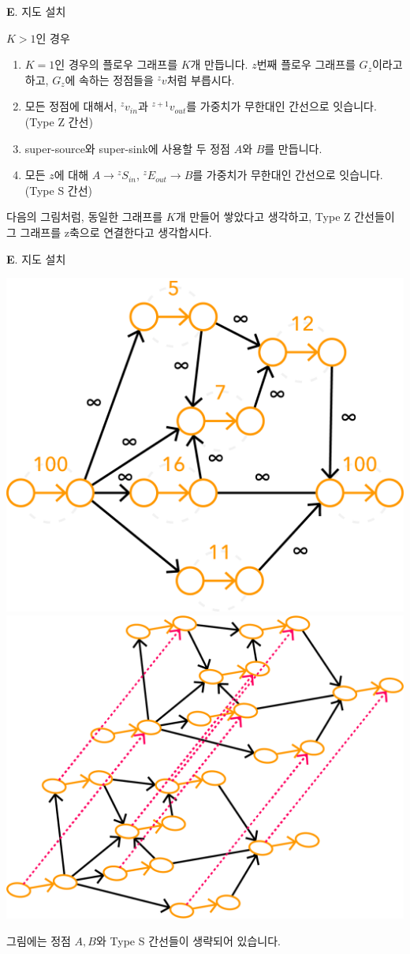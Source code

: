 \begin{frame}{\textbf{E}. 지도 설치}

    $K > 1$인 경우
    \begin{enumerate}
        \item $K=1$인 경우의 플로우 그래프를 $K$개 만듭니다. \newline
            $z$번째 플로우 그래프를 $G_z$이라고 하고, $G_z$에 속하는 정점들을 ${^z v}$처럼 부릅시다.
        \item 모든 정점에 대해서, $^z v _{in}$과 $^{z+1} v_{out}$를 가중치가 무한대인 간선으로 잇습니다. (Type Z 간선)
        \item super-source와 super-sink에 사용할 두 정점 $A$와 $B$를 만듭니다.
        \item 모든 $z$에 대해 $A \rightarrow {^z S_{in}}$, ${^z E_{out}} \rightarrow B$를 가중치가 무한대인 간선으로 잇습니다. (Type S 간선)
    \end{enumerate}
    
    다음의 그림처럼, 동일한 그래프를 $K$개 만들어 쌓았다고 생각하고, Type Z 간선들이 그 그래프를 z축으로 연결한다고 생각합시다.
    
\end{frame}


\begin{frame}{\textbf{E}. 지도 설치}

    \begin{center}
        \includegraphics[width=0.45\linewidth]{../images/setting-maps/maps_sol_1.png}
        \hspace{0.05\linewidth}
        \includegraphics[width=0.45\linewidth]{../images/setting-maps/maps_sol_2.png}
    \end{center}
    
    그림에는 정점 $A, B$와 Type S 간선들이 생략되어 있습니다.

\end{frame}


